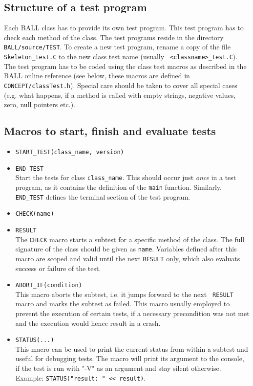 \documentclass[a4paper,10pt]{article}
\begin{document}
\subsection{Structure of a test program}

Each BALL class has to provide its own test program. This test program has to check
each method of the class. The test programs reside in the directory
{\tt BALL/source/TEST}. To create a new test program, rename a copy of the file
{\tt Skeleton\_test.C} to the new class test name (usually {\tt
<classname>\_test.C}). The test program has to be coded using the class test
macros as described in the BALL online reference (see below, these macros are
defined in {\tt CONCEPT/classTest.h}). Special care should be taken
to cover all special cases (e.g. what happens, if a method is called with
empty strings, negative values, zero, null pointers etc.). 

\subsection{Macros to start, finish and evaluate tests}
\begin{itemize}
	\item {\tt START\_TEST(class\_name, version)}\\
	\item {\tt END\_TEST}\\
		Start the tests for class {\tt class\_name}. This should occur just
		\emph{once} in a test program, as it contains the definition of the {\tt main}
		function. Similarly, {\tt END\_TEST} defines the terminal section of the test program.
	
	\item {\tt CHECK(name)}\\
	\item {\tt RESULT}\\
		The {\tt CHECK} macro starts a subtest for a specific method of the class. The full
		signature of the class should be given as {\tt name}.
		Variables defined after this macro are scoped and valid until the next
		{\tt RESULT} only, which also evaluats success or failure of the test.

	\item {\tt ABORT\_IF(condition)}\\
		This macro aborts the subtest, i.e. it jumps forward to the next {\tt
		RESULT} macro and marks the subtest as failed. This macro usually employed
		to prevent the execution of certain tests, if a necessary precondition was
		not met and the execution would hence result in a crash.

	\item {\tt STATUS(...)}\\
		This macro can be used to print the current status from within a subtest
		and useful for debugging tests. The macro will print its argument to the
		console, if the test is run with "-V" as an argument and stay silent
		otherwise. Example: {\tt STATUS("result: " << result)}.

\end{itemize}
\end{document}
